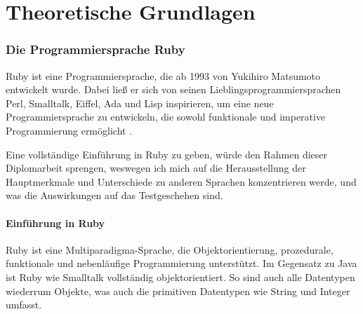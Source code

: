 \part{Theoretische Grundlagen}
\label{sec:theory}

\section{Die Programmiersprache Ruby}

Ruby ist eine Programmiersprache, die ab 1993 von Yukihiro Matsumoto entwickelt wurde. Dabei ließ er sich von seinen Lieblingsprogrammiersprachen Perl, Smalltalk, Eiffel, Ada und Lisp inspirieren, um eine neue Programmiersprache zu entwickeln, die sowohl funktionale und imperative Programmierung ermöglicht \citep{ruby_visual_identity_team_about_2011}. 

Eine vollständige Einführung in Ruby zu geben, würde den Rahmen dieser Diplomarbeit sprengen, weswegen ich mich auf die Herausstellung der Hauptmerkmale und Unterschiede zu anderen Sprachen konzentrieren werde, und was die Auswirkungen auf das Testgeschehen sind.


\subsection{Einführung in Ruby}
Ruby ist eine Multiparadigma-Sprache, die Objektorientierung, prozedurale, funktionale und nebenläufige Programmierung unterstützt. Im Gegensatz zu Java ist Ruby wie Smalltalk vollständig objektorientiert. So sind auch alle Datentypen wiederrum Objekte, was auch die primitiven Datentypen wie String und Integer umfasst. 

